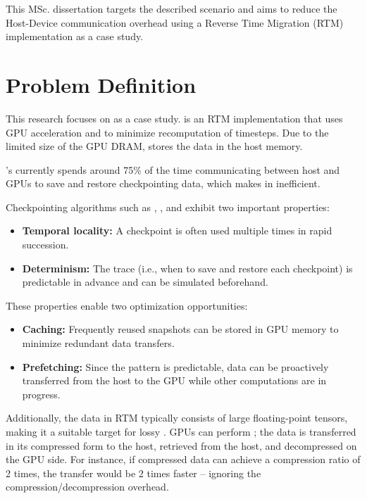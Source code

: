 \documentclass[Ingles]{ic-tese-v3}
\begin{document}
This MSc. dissertation targets the described scenario and aims to reduce the Host-Device communication overhead using a Reverse Time Migration (RTM) implementation as a case study.


\section{Problem Definition}
This research focuses on \awave as a case study. \awave is an RTM implementation that uses GPU acceleration and \checkpointing to minimize recomputation of timesteps. Due to the limited size of the GPU DRAM, \awave stores the \checkpointing data in the host memory.

\awave's \checkpointing currently spends around 75\% of the time communicating between host and GPUs to save and restore checkpointing data, which makes \checkpointing in \awave inefficient.

Checkpointing algorithms such as \revolve, \zcut, and \uniform exhibit two important properties:

\begin{itemize}
    \item \textbf{Temporal locality:}  A checkpoint is often used multiple times in rapid succession.
    \item \textbf{Determinism:} The \checkpointing trace (i.e., when to save and restore each checkpoint) is predictable in advance and can be simulated beforehand.
\end{itemize}

These properties enable two optimization opportunities:

\begin{itemize}
    \item \textbf{Caching:} Frequently reused snapshots can be stored in GPU memory to minimize redundant data transfers.
    \item \textbf{Prefetching:} Since the \checkpointing pattern is predictable, data can be proactively transferred from the host to the GPU while other computations are in progress.
\end{itemize}


Additionally, the data in RTM typically consists of large floating-point tensors, making it a suitable target for lossy \compression. GPUs can perform \compression; the data is transferred in its compressed form to the host, retrieved from the host, and decompressed on the GPU side. For instance, if compressed data can achieve a compression ratio of 2 times, the transfer would be 2 times faster -- ignoring the compression/decompression overhead. 
\end{document}
